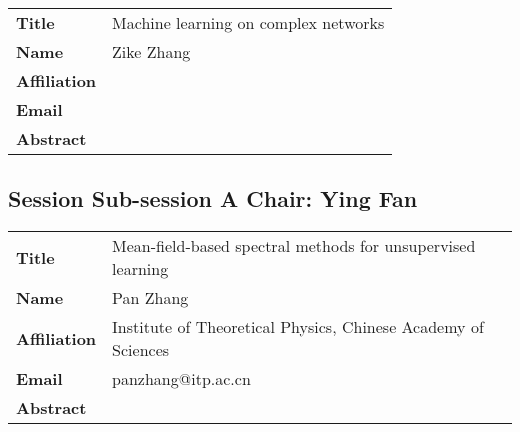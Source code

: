 \documentclass[oneside,A4paper,12pt]{article}
\begin{document}
\newpage
\begin{longtable}{p{2cm}p{14cm}}
\toprule
\textbf{Title} & Machine learning on complex networks\\
\textbf{Name} & Zike Zhang\\
\textbf{Affiliation} & \\
\textbf{Email} & \\
\textbf{Abstract} & \\
\bottomrule
\end{longtable}

\newpage
\subsection*{Session \uppercase\expandafter{} \hspace{10mm} Sub-session A \hspace{10mm} Chair: Ying Fan}
\label{sec:org46ba682}
\begin{longtable}{p{2cm}p{14cm}}
\toprule
\textbf{Title} & Mean-field-based spectral methods for unsupervised learning\\
\textbf{Name} & Pan Zhang\\
\textbf{Affiliation} & Institute of Theoretical Physics, Chinese Academy of Sciences\\
\textbf{Email} & panzhang@itp.ac.cn\\
\textbf{Abstract} & \\
\bottomrule
\end{longtable}
\end{document}
